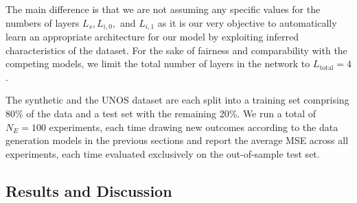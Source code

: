 The main difference is that we are not assuming any specific values for the numbers of layers $L_s, L_{i,0},$ and $L_{i,1}$ as it is our very objective to automatically learn an appropriate architecture for our model by exploiting inferred characteristics of the dataset. For the sake of fairness and  comparability with the competing models, we limit the total number of layers in the network to $L_{\text{total}} = 4$. 

The synthetic and the UNOS dataset are each split into a training set comprising 80\% of the data and a test set with the remaining 20\%. We run a total of $N_E = 100$ experiments, each time drawing new outcomes according to the data generation models in the previous sections
and report the average MSE across all experiments, each time evaluated exclusively on the out-of-sample test set. 


\subsection{Results and Discussion}








